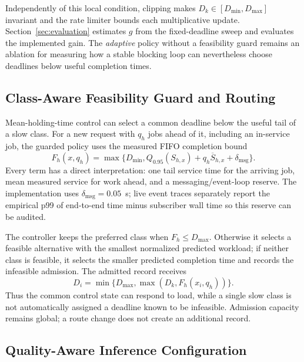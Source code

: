 \documentclass[journal]{IEEEtran}
\begin{document}
Independently of this local condition, clipping makes $D_k\in[D_{\min},D_{\max}]$ invariant and the rate limiter bounds each multiplicative update. Section~\ref{sec:evaluation} estimates $g$ from the fixed-deadline sweep and evaluates the implemented gain. The \emph{adaptive} policy without a feasibility guard remains an ablation for measuring how a stable blocking loop can nevertheless choose deadlines below useful completion times.

\subsection{Class-Aware Feasibility Guard and Routing}

Mean-holding-time control can select a common deadline below the useful tail of a slow class. For a new request with $q_h$ jobs ahead of it, including an in-service job, the guarded policy uses the measured FIFO completion bound
\begin{equation}
 F_h(x,q_h)=\max\{D_{\min},Q_{0.95}(S_{h,x})+q_h\overline S_{h,x}+\delta_{\mathrm{msg}}\}.
 \label{eq:floors}
\end{equation}
Every term has a direct interpretation: one tail service time for the arriving job, mean measured service for work ahead, and a messaging/event-loop reserve. The implementation uses $\delta_{\mathrm{msg}}=0.05$~s; live event traces separately report the empirical p99 of end-to-end time minus subscriber wall time so this reserve can be audited.

The controller keeps the preferred class when $F_h\le D_{\max}$. Otherwise it selects a feasible alternative with the smallest normalized predicted workload; if neither class is feasible, it selects the smaller predicted completion time and records the infeasible admission. The admitted record receives
\begin{equation}
 D_i=\min\{D_{\max},\max(D_k,F_h(x_i,q_h))\}.
 \label{eq:record-deadline}
\end{equation}
Thus the common control state can respond to load, while a single slow class is not automatically assigned a deadline known to be infeasible. Admission capacity remains global; a route change does not create an additional record.

\subsection{Quality-Aware Inference Configuration}
\end{document}
